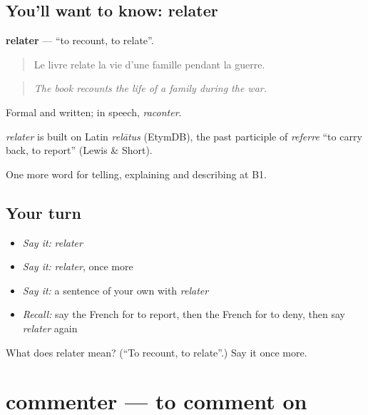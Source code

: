 \subsection*{You'll want to know: relater}
\textbf{relater} — \textquotedblleft{}to recount, to relate\textquotedblright{}.

\begin{quote}
Le livre relate la vie d'une famille pendant la guerre.
\end{quote}

\begin{quote}
\emph{The book recounts the life of a family during the war.}
\end{quote}

Formal and written; in speech, \emph{raconter}.

\begin{cousinweb}
\emph{relater} is built on Latin \emph{relātus} (EtymDB), the past participle of \emph{referre} \textquotedblleft{}to carry back, to report\textquotedblright{} (Lewis \& Short).
\end{cousinweb}

\begin{grammarlens}[title={What you've built}]
One more word for telling, explaining and describing at B1.
\end{grammarlens}

\subsection*{Your turn}
\begin{itemize}
\raggedright
  \item \emph{Say it:} \emph{relater}
  \item \emph{Say it:} \emph{relater}, once more
  \item \emph{Say it:} a sentence of your own with \emph{relater}
  \item \emph{Recall:} say the French for to report, then the French for to deny, then say \emph{relater} again
\end{itemize}

\begin{tcolorbox}[breakable,colback=teal!4,colframe=teal!35!black,title={Before you move on}]
What does relater mean? (\textquotedblleft{}To recount, to relate\textquotedblright{}.) Say it once more.
\end{tcolorbox}
\section[commenter]{commenter — to comment on}

